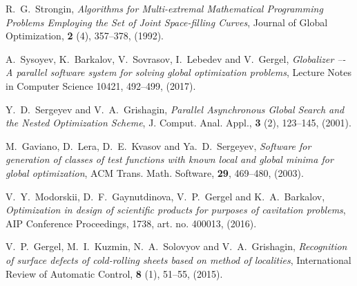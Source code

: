 \documentclass[12pt]{amsart}
\begin{document}
\begin{thebibliography}{20}
R.~G.~Strongin, \textit{Algorithms for Multi-extremal Mathematical Programming Problems Employing the Set of Joint Space-filling Curves}, Journal of Global Optimization, \textbf{2} (4), 357--378, (1992).

A.~Sysoyev, K.~Barkalov, V.~Sovrasov, I.~Lebedev and V.~Gergel, \textit{Globalizer –- A parallel software system for solving global optimization problems}, Lecture Notes in Computer Science 10421, 492--499, (2017). 

Y.~D.~Sergeyev and V.~A.~Grishagin, \textit{Parallel Asynchronous Global Search and the Nested Optimization Scheme}, J. Comput. Anal. Appl., \textbf{3} (2), 123--145, (2001).

M.~Gaviano, D.~Lera, D.~E.~Kvasov and Ya.~D.~Sergeyev, \textit{Software for generation of classes of test functions with known local and global minima for global optimization}, ACM Trans. Math. Software, \textbf{29}, 469--480, (2003).

V.~Y.~Modorskii, D.~F.~Gaynutdinova, V.~P.~Gergel and K.~A.~Barkalov, \textit{Optimization in design of scientific products for purposes of cavitation problems}, AIP Conference Proceedings, 1738, art. no. 400013, (2016).

V.~P.~Gergel, M.~I.~Kuzmin, N.~A.~Solovyov and V.~A.~Grishagin, \textit{Recognition of surface defects of cold-rolling sheets based on method of localities}, International Review of Automatic Control, \textbf{8} (1), 51--55, (2015).

\end{thebibliography}
\end{document}
